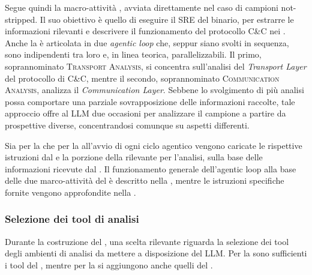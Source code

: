 
Segue quindi la macro-attività \reversing{}, avviata direttamente nel caso di campioni not-stripped. Il suo obiettivo è quello di eseguire il SRE del binario, per estrarre le informazioni rilevanti e descrivere il funzionamento del protocollo C\&C nei \report{}. Anche la \reversing{} è articolata in due \emph{agentic loop} che, seppur siano svolti in sequenza, sono indipendenti tra loro e, in linea teorica, parallelizzabili. Il primo, soprannominato \textsc{Transport Analysis}, si concentra sull'analisi del \emph{Transport Layer} del protocollo di C\&C, mentre il secondo, soprannominato \textsc{Communication Analysis}, analizza il \emph{Communication Layer}. Sebbene lo svolgimento di più analisi possa comportare una parziale sovrapposizione delle informazioni raccolte, tale approccio offre al LLM due occasioni per analizzare il campione a partire da prospettive diverse, concentrandosi comunque su aspetti differenti.


Sia per la \renaming{} che per la \reversing{} all'avvio di ogni ciclo agentico vengono caricate le rispettive istruzioni dal \prompt{} e la porzione della \kb{} rilevante per l'analisi, sulla base delle informazioni ricevute dal \classifier{}. Il funzionamento generale dell'agentic loop alla base delle due marco-attività del \sreagent{} è descritto nella , mentre le istruzioni specifiche fornite vengono approfondite nella .



\subsubsection{Selezione dei tool di analisi}

Durante la costruzione del \sreagent{}, una scelta rilevante riguarda la selezione dei tool degli ambienti di analisi da mettere a disposizione del LLM. Per la \renaming{} sono sufficienti i tool del \sreframework{}, mentre per la \reversing{} si aggiungono anche quelli del \sandbox{}.

